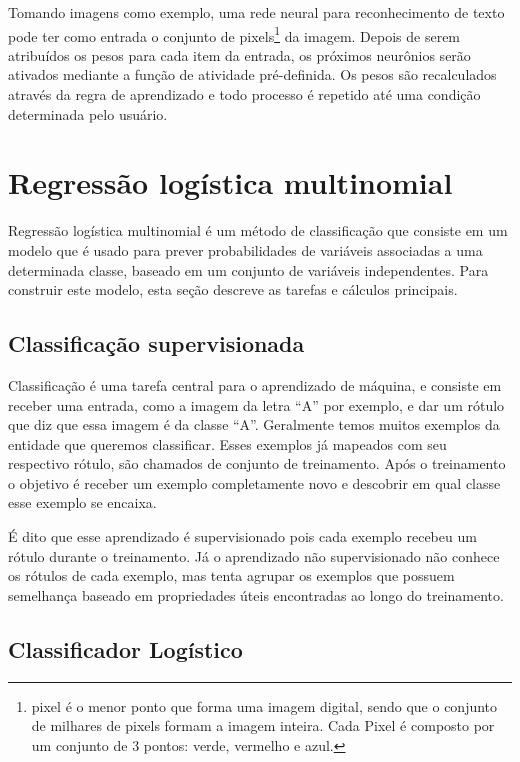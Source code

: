 Tomando imagens como exemplo, uma rede neural para reconhecimento de
texto pode ter como entrada o conjunto de pixels\footnote{pixel é o
  menor ponto que forma uma imagem digital, sendo que o conjunto de
  milhares de pixels formam a imagem inteira. Cada Pixel é composto
  por um conjunto de 3 pontos: verde, vermelho e azul.} da
imagem. Depois de serem atribuídos os pesos para cada item da entrada,
os próximos neurônios serão ativados mediante a função de atividade
pré-definida. Os pesos são recalculados através da regra de
aprendizado e todo processo é repetido até uma condição determinada
pelo usuário.

\section{Regressão logística multinomial}

Regressão logística multinomial é um método de classificação que
consiste em um modelo que é usado para prever probabilidades de
variáveis associadas a uma determinada classe, baseado em um conjunto
de variáveis independentes. Para construir este modelo, esta seção
descreve as tarefas e cálculos principais.

\subsection{Classificação supervisionada}

Classificação é uma tarefa central para o aprendizado de máquina, e
consiste em receber uma entrada, como a imagem da letra ``A'' por
exemplo, e dar um rótulo que diz que essa imagem é da classe
``A''. Geralmente temos muitos exemplos da entidade que queremos
classificar. Esses exemplos já mapeados com seu respectivo rótulo, são
chamados de conjunto de treinamento. Após o treinamento o objetivo é
receber um exemplo completamente novo e descobrir em qual classe esse
exemplo se encaixa.

É dito que esse aprendizado é supervisionado pois cada exemplo
recebeu um rótulo durante o treinamento. Já o aprendizado não
supervisionado não conhece os rótulos de cada exemplo, mas tenta
agrupar os exemplos que possuem semelhança baseado em propriedades
úteis encontradas ao longo do treinamento.

\subsection{Classificador Logístico}

